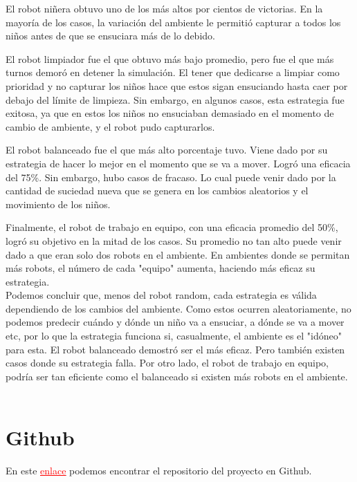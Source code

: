 \documentclass[twoside]{article}
\begin{document}
El robot ni\~nera obtuvo uno de los m\'as altos por cientos de victorias. En la mayor\'ia de los casos, la variaci\'on del ambiente le permiti\'o capturar a todos los ni\~nos antes de que se ensuciara m\'as de lo debido.

El robot limpiador fue el que obtuvo m\'as bajo promedio, pero fue el que m\'as turnos demor\'o en detener la simulaci\'on. El tener que dedicarse a limpiar como prioridad y no capturar los ni\~nos hace que estos sigan ensuciando hasta caer por debajo del l\'imite de limpieza. Sin embargo, en algunos casos, esta estrategia fue exitosa, ya que en estos los ni\~nos no ensuciaban demasiado en el momento de cambio de ambiente, y el robot pudo capturarlos.

El robot balanceado fue el que m\'as alto porcentaje tuvo. Viene dado por su estrategia de hacer lo mejor en el momento que se va a mover. Logr\'o una eficacia del 75\%. Sin embargo, hubo casos de fracaso. Lo cual puede venir dado por la cantidad de suciedad nueva que se genera en los cambios aleatorios y el movimiento de los ni\~nos.

Finalmente, el robot de trabajo en equipo, con una eficacia promedio del 50\%, logr\'o su objetivo en la mitad de los casos. Su promedio no tan alto puede venir dado a que eran solo dos robots en el ambiente. En ambientes donde se permitan m\'as robots, el n\'umero de cada "equipo" aumenta, haciendo m\'as eficaz su estrategia.\\

Podemos concluir que, menos del robot random, cada estrategia es v\'alida dependiendo de los cambios del ambiente. Como estos ocurren aleatoriamente, no podemos predecir cu\'ando y d\'onde un ni\~no va a ensuciar, a d\'onde se va a mover etc, por lo que la estrategia funciona si, casualmente, el ambiente es el "id\'oneo" para esta. El robot balanceado demostr\'o ser el m\'as eficaz. Pero tambi\'en existen casos donde su estrategia falla. Por otro lado, el robot de trabajo en equipo, podr\'ia ser tan eficiente como el balanceado si existen m\'as robots en el ambiente.\\\\

\section{Github}
En este \href{https://github.com/Alexx-4/Agentes-Haskell}{\textcolor{red}{\underline{enlace}}} podemos encontrar el repositorio del proyecto en Github.
\end{document}
